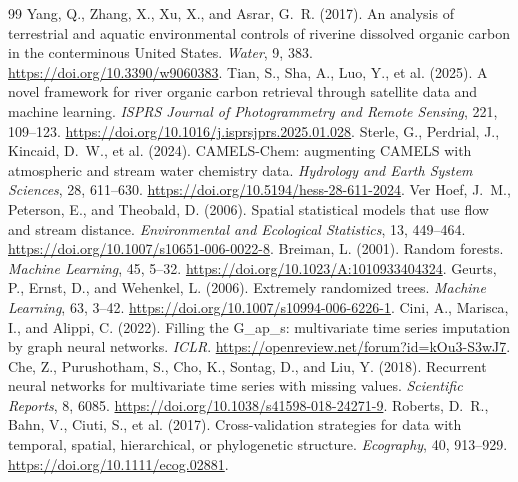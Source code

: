 \documentclass[11pt]{article}
\begin{document}
\begin{thebibliography}{99}
Yang, Q., Zhang, X., Xu, X., and Asrar, G.~R. (2017). An analysis of terrestrial and aquatic environmental controls of riverine dissolved organic carbon in the conterminous United States. \emph{Water}, 9, 383. \url{https://doi.org/10.3390/w9060383}.
Tian, S., Sha, A., Luo, Y., et al. (2025). A novel framework for river organic carbon retrieval through satellite data and machine learning. \emph{ISPRS Journal of Photogrammetry and Remote Sensing}, 221, 109--123. \url{https://doi.org/10.1016/j.isprsjprs.2025.01.028}.
Sterle, G., Perdrial, J., Kincaid, D.~W., et al. (2024). CAMELS-Chem: augmenting CAMELS with atmospheric and stream water chemistry data. \emph{Hydrology and Earth System Sciences}, 28, 611--630. \url{https://doi.org/10.5194/hess-28-611-2024}.
Ver Hoef, J.~M., Peterson, E., and Theobald, D. (2006). Spatial statistical models that use flow and stream distance. \emph{Environmental and Ecological Statistics}, 13, 449--464. \url{https://doi.org/10.1007/s10651-006-0022-8}.
Breiman, L. (2001). Random forests. \emph{Machine Learning}, 45, 5--32. \url{https://doi.org/10.1023/A:1010933404324}.
Geurts, P., Ernst, D., and Wehenkel, L. (2006). Extremely randomized trees. \emph{Machine Learning}, 63, 3--42. \url{https://doi.org/10.1007/s10994-006-6226-1}.
Cini, A., Marisca, I., and Alippi, C. (2022). Filling the G\_ap\_s: multivariate time series imputation by graph neural networks. \emph{ICLR}. \url{https://openreview.net/forum?id=kOu3-S3wJ7}.
Che, Z., Purushotham, S., Cho, K., Sontag, D., and Liu, Y. (2018). Recurrent neural networks for multivariate time series with missing values. \emph{Scientific Reports}, 8, 6085. \url{https://doi.org/10.1038/s41598-018-24271-9}.
Roberts, D.~R., Bahn, V., Ciuti, S., et al. (2017). Cross-validation strategies for data with temporal, spatial, hierarchical, or phylogenetic structure. \emph{Ecography}, 40, 913--929. \url{https://doi.org/10.1111/ecog.02881}.
\end{thebibliography}
\end{document}
